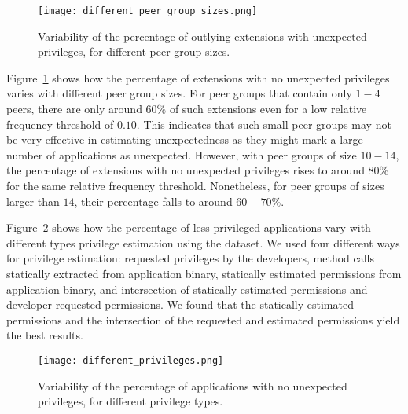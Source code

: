 \begin{figure}[!htbp]
\centering
\texttt{[image: different\_peer\_group\_sizes.png]}
\caption{Variability of the percentage of outlying extensions with unexpected privileges, for different peer group sizes.}
\label{fig:percentage_unexpected_peer_group_size}
\end{figure}

 Figure~\ref{fig:percentage_unexpected_peer_group_size} 
shows how the percentage of  \Chrome{} extensions with no unexpected privileges varies 
with different peer group sizes. For peer groups that contain only $1-4$ peers, there are only 
around $60\%$ of such extensions even for a low relative frequency threshold of $0.10$.  
This indicates that such small peer groups may not be very effective in estimating unexpectedness 
as they might mark a large number of applications as unexpected. However, with peer groups of 
size $10-14$, the percentage of extensions with no unexpected privileges rises to around $80\%$ 
for the same relative frequency threshold. Nonetheless, for peer groups of sizes larger than 
$14$, their percentage falls to around $60-70\%$.

 Figure~\ref{fig:percentage_unexpected_different_privileges} 
shows how the percentage of less-privileged applications vary with different types privilege estimation using the 
\Android{} dataset. We used four different ways for privilege estimation: requested privileges by the 
developers, method calls statically extracted from application binary,  statically estimated permissions from 
application binary, and intersection of statically estimated permissions and developer-requested permissions. 
We found that the statically estimated permissions and the intersection of the requested and estimated permissions 
yield the best results. 



\begin{figure}[!t]
\centering
\texttt{[image: different\_privileges.png]}
\caption{Variability of the percentage of applications with no unexpected privileges, for different privilege types.}
\label{fig:percentage_unexpected_different_privileges}
\end{figure}





